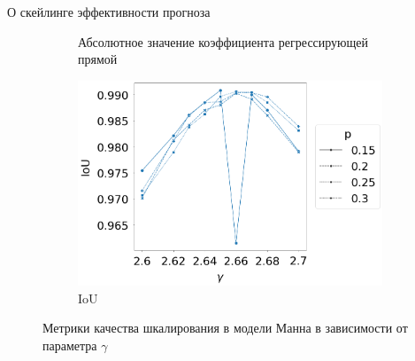 \documentclass{beamer}
\begin{document}
\begin{frame}{О скейлинге эффективности прогноза}
\begin{onlyenv}
\begin{figure}[h]
\begin{subfigure}[t]{0.27\textwidth}
					\caption{Абсолютное значение коэффициента регрессирующей прямой}
				\end{subfigure}
				\hspace{0mm}
				\begin{subfigure}[t]{0.27\textwidth}
					\centering
					\includegraphics[height=\textwidth]{images/IoU_manna}
					\caption{IoU}
				\end{subfigure}
				\caption*{Метрики качества шкалирования в модели Манна в зависимости от параметра $\gamma$}\label{pic:manna_scaling_metrics}
			\end{figure}
		\end{onlyenv}
	\end{frame}
\end{document}
